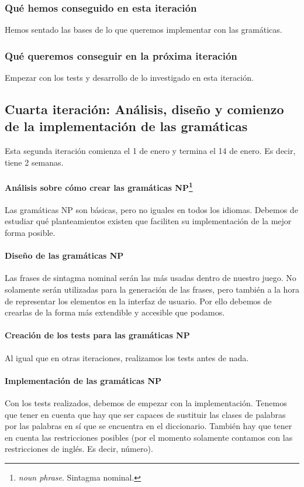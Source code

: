 \subsubsection{Qué hemos conseguido en esta iteración}

Hemos sentado las bases de lo que queremos implementar con las gramáticas.

\subsubsection{Qué queremos conseguir en la próxima iteración}

Empezar con los tests y desarrollo de lo investigado en esta iteración.

\subsection{Cuarta iteración: Análisis, diseño y comienzo de la implementación de las gramáticas}

Esta segunda iteración comienza el 1 de enero y termina el 14 de enero. Es decir, tiene 2 semanas.

\paragraph{Análisis sobre cómo crear las gramáticas NP\footnote{\textit{noun phrase}. Sintagma nominal.}} Las gramáticas NP son básicas, pero no iguales en todos los idiomas. Debemos de estudiar qué planteamientos existen que faciliten su implementación de la mejor forma posible.

\paragraph{Diseño de las gramáticas NP} Las frases de sintagma nominal serán las más usadas dentro de nuestro juego. No solamente serán utilizadas para la generación de las frases, pero también a la hora de representar los elementos en la interfaz de usuario. Por ello debemos de crearlas de la forma más extendible y accesible que podamos.

\paragraph{Creación de los tests para las gramáticas NP} Al igual que en otras iteraciones, realizamos los tests antes de nada.

\paragraph{Implementación de las gramáticas NP} Con los tests realizados, debemos de empezar con la implementación. Tenemos que tener en cuenta que hay que ser capaces de sustituir las clases de palabras por las palabras en sí que se encuentra en el diccionario. También hay que tener en cuenta las restricciones posibles (por el momento solamente contamos con las restricciones de inglés. Es decir, número).

